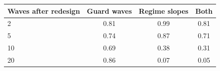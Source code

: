 \begin{tabular}{lccc}
\toprule
Waves after redesign & Guard waves & Regime slopes & Both \\
\midrule
2 & 0.81 & 0.99 & 0.81 \\
5 & 0.74 & 0.87 & 0.71 \\
10 & 0.69 & 0.38 & 0.31 \\
20 & 0.86 & 0.07 & 0.05 \\
\bottomrule
\end{tabular}

